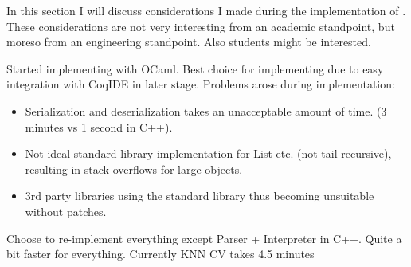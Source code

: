 In this section I will discuss considerations I made during the implementation of \roerei.
These considerations are not very interesting from an academic standpoint, but moreso from an engineering standpoint.
Also students might be interested.

Started implementing with OCaml.
Best choice for implementing due to easy integration with CoqIDE in later stage.
Problems arose during implementation:
\begin{itemize}
\item Serialization and deserialization takes an unacceptable amount of time. (3 minutes vs 1 second in C++).
\item Not ideal standard library implementation for List etc. (not tail recursive), resulting in stack overflows for large objects.
\item 3rd party libraries using the standard library thus becoming unsuitable without patches.
\end{itemize}

Choose to re-implement everything except Parser + Interpreter in C++.
Quite a bit faster for everything.
Currently KNN CV takes 4.5 minutes
